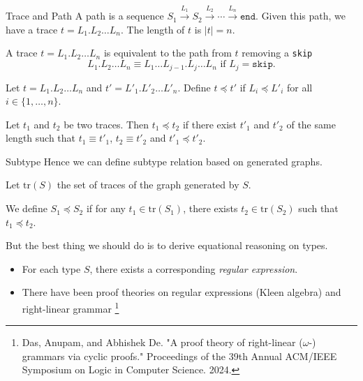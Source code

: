 \begin{frame}{Trace and Path}
  A path is a sequence $S_1\xrightarrow{L_1}S_2\xrightarrow{L_2}\cdots\xrightarrow{L_n}\texttt{end}$. Given this path, we have a trace $t=L_1.L_2 \ldots L_n$. The length of $t$ is $|t|=n$.

  A trace $t=L_1.L_2 \ldots L_n$ is equivalent to the path from $t$ removing a \texttt{skip}
  $$L_1.L_2 \ldots L_n \equiv L_1\ldots L_{j-1}.L_j\ldots L_n \text{ if } L_j = \texttt{skip}.$$

  Let $t=L_1.L_2 \ldots L_n$ and $t'=L'_1.L'_2 \ldots L'_n$. Define $t\preceq t'$ if $L_i\preceq L'_i$ for all $i\in\{1,\ldots,n\}$.

  Let $t_1$ and $t_2$ be two traces. Then $t_1\preceq t_2$ if there exist $t'_1$ and $t'_2$ of the same length such that $t_1 \equiv t'_1$, $t_2 \equiv t'_2$ and $t'_1\preceq t'_2$.
\end{frame}

\begin{frame}{Subtype}
  Hence we can define subtype relation based on generated graphs.

  Let $\text{tr}(S)$ the set of traces of the graph generated by $S$.

  We define $S_1\preceq S_2$ if for any $t_1\in\text{tr}(S_1)$, there exists $t_2\in\text{tr}(S_2)$ such that $t_1\preceq t_2$.

  But the best thing we should do is to derive equational reasoning on types.

  \begin{itemize}
    \item For each type $S$, there exists a corresponding \textit{regular expression}.
    \item There have been proof theories on regular expressions (Kleen algebra) and right-linear grammar \footnote{Das, Anupam, and Abhishek De. "A proof theory of right-linear ($\omega$-) grammars via cyclic proofs." Proceedings of the 39th Annual ACM/IEEE Symposium on Logic in Computer Science. 2024.}
  \end{itemize}
\end{frame}

